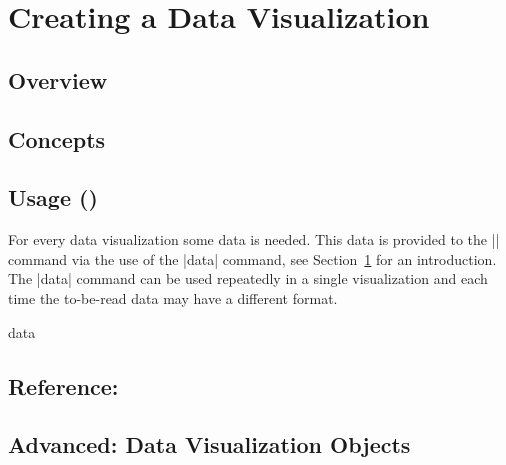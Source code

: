 %
%
%


\section{Creating a Data Visualization}
\label{section-dv-main}

\subsection{Overview}

\subsection{Concepts}

\subsection{Usage (\tikzname)}

For every data visualization some data is needed. This data is
provided to the |\datavisualization| command via the use of the |data|
command, see Section~\ref{section-dv-main} for an introduction. The
|data| command can be used repeatedly in a single visualization and
each time the to-be-read data may have a different format.

\begin{datavisualizationoperation}{data}{}
  
\end{datavisualizationoperation}


\subsection{Reference: }

\subsection{Advanced: Data Visualization Objects}

\label{section-dv-main-setup}
